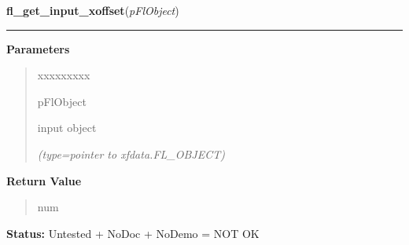 \hspace{.8\funcindent}\begin{boxedminipage}{\funcwidth}

    \raggedright \textbf{fl\_get\_input\_xoffset}(\textit{pFlObject})

    \vspace{-1.5ex}

    \rule{\textwidth}{0.5\fboxrule}
\setlength{\parskip}{2ex}
\setlength{\parskip}{1ex}
      \textbf{Parameters}
      \vspace{-1ex}

      \begin{quote}
        \begin{Ventry}{xxxxxxxxx}

          \item[pFlObject]

          input object

            {\it (type=pointer to xfdata.FL\_OBJECT)}

        \end{Ventry}

      \end{quote}

      \textbf{Return Value}
    \vspace{-1ex}

      \begin{quote}
      num

      \end{quote}

\textbf{Status:} Untested + NoDoc + NoDemo = NOT OK



    \end{boxedminipage}

    \label{xformslib:flinput:fl_set_input_fieldchar}

    \vspace{0.5ex}

